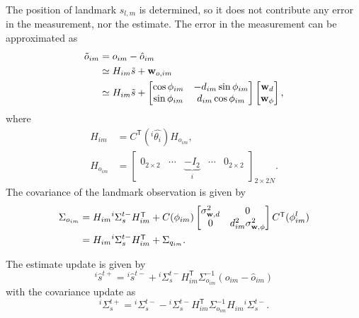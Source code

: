 \documentclass[xcolor=x11names]{article}
\DeclareMathOperator\T{\mathsf{T}}
\begin{document}
   The position of landmark $s_{l,m}$ is determined, so it does not contribute any error in the measurement, nor the estimate. The error in the measurement can be approximated as
   \begin{align}
      \tilde{o}_{im} &= {o}_{im} - \hat{o}_{im} \notag \\
         &\simeq {H}_{im} \tilde{s} + \mathbf{w}_{o,im} \notag \\
         &\simeq {H}_{im} \tilde{s} + 
         \begin{bmatrix} 
            \cos\phi_{im} & - d_{im} \sin \phi_{im}\\
            \sin\phi_{im} & d_{im} \cos \phi_{im}
         \end{bmatrix}
         \begin{bmatrix} 
            \mathbf{w}_{d}\\  \mathbf{w}_{\phi}
         \end{bmatrix},
   \end{align}
   where
   \begin{align*}
      {H}_{im} &= C^{\T}({}^i\hat{\theta_i}) H_{o_{im}}, \\
      {H}_{o_{im}} &= \begin{bmatrix} \\
            0_{2\times 2} & \cdots & \underbrace{-I_2}_i & \cdots & 0_{2\times2}
         \end{bmatrix}_{2\times 2N}.
   \end{align*}       
   The covariance of the landmark observation is given by
   \begin{align}
      \Sigma_{o_{im}} &=  H_{im} {}^i\Sigma^{t-}_{s} H_{im}^{\T} +  C(\phi_{im}) 
         \begin{bmatrix} 
            \sigma^2_{\mathbf{w},d} & 0 \\  0 & d_{im}^2 \sigma^2_{\mathbf{w},\phi}
         \end{bmatrix}
         C^{\T}(\phi^l_{im}) \notag \\
         &=  H_{im} {}^i\Sigma^{t-}_{s} H_{im}^{\T} +  \Sigma_{q_{im}}.
         \label{eq:landmark_observation_cov_update}
   \end{align}

   The estimate update is given by
   \begin{equation}
      ^i\hat{s}^{t+} = {}^i\hat{s}^{t-} + {}^i\Sigma^{t-}_{s}  H_{im}^{\T} \Sigma_{o_{im}}^{-1} ({o}_{im} - \hat{o}_{im})
   \end{equation}  
with the covariance update as 
   \begin{equation}
      {}^i\Sigma^{t+}_{s} = {}^i\Sigma^{t-}_{s} - {}^i\Sigma^{t-}_{s}  H_{im}^{\T}  \Sigma_{o_{im}}^{-1} H_{im} {}^i\Sigma^{t-}_{s}.
      \label{eq:landmark_observation_cov_update}
   \end{equation}    
\end{document}
